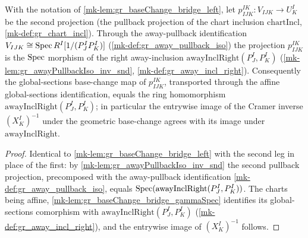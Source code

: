 \begin{lemma}\label{mk-lem:gr_baseChange_bridge_right}
  \leanok

  With the notation of \ref{mk-lem:gr_baseChange_bridge_left}, let
  \(p^{IK}_{IJK} : V_{IJK} \to U^I_K\) be the second projection (the pullback projection of the
  chart inclusion \(\mathrm{chartIncl}\), \ref{mk-def:gr_chart_incl}). Through the away-pullback
  identification \(V_{IJK} \cong \operatorname{Spec} R^I[1/(P^I_J P^I_K)]\) (\ref{mk-def:gr_away_pullback_iso})
  the projection \(p^{IK}_{IJK}\) is the \(\operatorname{Spec}\) morphism of the right away-inclusion
  \(\mathrm{awayInclRight}(P^I_J, P^I_K)\) (\ref{mk-lem:gr_awayPullbackIso_inv_snd},
  \ref{mk-def:gr_away_incl_right}). Consequently the global-sections base-change map of
  \(p^{IK}_{IJK}\), transported through the affine global-sections identification, equals the
  ring homomorphism \(\mathrm{awayInclRight}(P^I_J, P^I_K)\); in particular the entrywise image of
  the Cramer inverse \((X^I_K)^{-1}\) under the geometric base-change agrees with its image under
  \(\mathrm{awayInclRight}\).
\end{lemma}
\begin{proof}
  Identical to \ref{mk-lem:gr_baseChange_bridge_left} with the second leg in place of the first:
  by \ref{mk-lem:gr_awayPullbackIso_inv_snd} the second pullback projection, precomposed with the
  away-pullback identification \ref{mk-def:gr_away_pullback_iso}, equals
  \(\operatorname{Spec}(\mathrm{awayInclRight}(P^I_J, P^I_K))\). The charts being affine,
  \ref{mk-lem:gr_baseChange_bridge_gammaSpec} identifies its global-sections comorphism with
  \(\mathrm{awayInclRight}(P^I_J, P^I_K)\) (\ref{mk-def:gr_away_incl_right}), and the entrywise
  image of \((X^I_K)^{-1}\) follows.
\end{proof}

